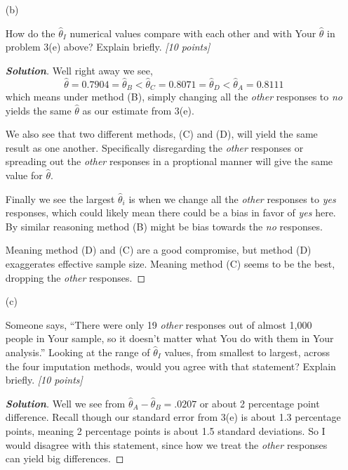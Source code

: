 \documentclass[12pt]{article}
\newenvironment{solution}{\begin{proof}[\textbf{\textit{Solution}}] }{\end{proof}}
\begin{document}
\begin{itemize}
\begin{itemize}
\item[(b)]

How do the $\hat{ \theta }_I$ numerical values compare with each other and with Your $\hat{ \theta }$ in problem 3(e) above? Explain briefly. \textit{[10 points]}
\begin{tcolorbox}
    \begin{solution}
        Well right away we see,
        \[ \hat{\theta} =0.7904 =  \hat{\theta}_B < \hat{\theta}_C = 0.8071 =\hat{\theta}_D < \hat{\theta}_A = 0.8111\]
        which means under method (B), simply changing all the \textit{other} responses to \textit{no} yields the same $\hat{\theta}$ as our estimate from 3(e). 

        We also see that two different methods, (C) and (D), will yield the same result as one another. Specifically disregarding the \textit{other} responses or spreading out the \textit{other} responses in a proptional manner will give the same value for $\hat{\theta}$.

        Finally we see the largest $\hat{\theta}_i$ is when we change all the \textit{other} responses to \textit{yes} responses, which could likely mean there could be a bias in favor of \textit{yes} here. By similar reasoning method (B) might be bias towards the \textit{no} responses. 
        
        Meaning method (D) and (C) are a good compromise, but method (D) exaggerates effective sample size. Meaning method (C) seems to be the best, dropping the \textit{other} responses. 
    \end{solution}
\end{tcolorbox}

\vspace*{0.5in}
\newpage
\item[(c)]

Someone says, ``There were only 19 \textit{other} responses out of almost 1,000 people in Your sample, so it doesn't matter what You do with them in Your analysis.'' Looking at the range of $\hat{ \theta }_I$ values, from smallest to largest, across the four imputation methods, would you agree with that statement? Explain briefly. \textit{[10 points]}

\begin{tcolorbox}
    \begin{solution}
        Well we see from $\hat{\theta}_A - \hat{\theta}_B = .0207$ or about 2 percentage point difference. Recall though our standard error from 3(e) is about 1.3 percentage points, meaning 2 percentage points is about 1.5 standard deviations. So I would disagree with this statement, since how we treat the \textit{other} responses can yield big differences. 
    \end{solution}
\end{tcolorbox}


\end{itemize}
\end{itemize}
\end{document}
